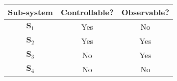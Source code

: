 
\begin{center}
	\begin{tabular}{|c|c|c|}
	\hline
	\textbf{Sub-system} & \textbf{Controllable?} & \textbf{Observable?}\\
	\hline
	$\mathbf{S}_1$ & Yes & No\\
	\hline
	$\mathbf{S}_2$ & Yes & Yes\\
	\hline
	$\mathbf{S}_3$ & No & Yes\\
	\hline
	$\mathbf{S}_4$ & No & No\\
	\hline
	\end{tabular}	
\end{center}

\endinput

